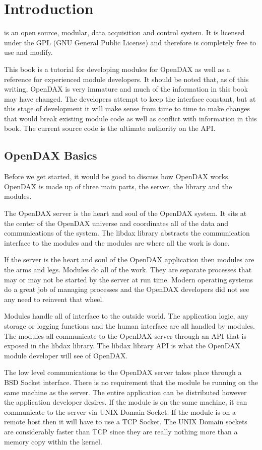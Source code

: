 \chapter{Introduction}
\opendax is an open source, modular, data acquisition and control system. It is licensed under the GPL (GNU General Public License) and therefore is completely free to use and modify.

This book is a tutorial for developing modules for OpenDAX as well as a reference for experienced module developers.  It should be noted that, as of this writing, OpenDAX is very immature and much of the information in this book may have changed.  The developers attempt to keep the interface constant, but at this stage of development it will make sense from time to time to make changes that would break existing module code as well as conflict with information in this book.  The current source code is the ultimate authority on the API.


\section{OpenDAX Basics}
Before we get started, it would be good to discuss how OpenDAX works.  OpenDAX is made up of three main parts, the server, the library and the modules.

The OpenDAX server is the heart and soul of the OpenDAX system.  It sits at the center of the OpenDAX universe and coordinates all of the data and communications of the system.  The libdax library abstracts the communication interface to the modules and the modules are where all the work is done.

If the server is the heart and soul of the OpenDAX application then modules are the arms and legs.  Modules do all of the work.  They are separate processes that may or may not be started by the server at run time.  Modern operating systems do a great job of managing processes and the OpenDAX developers did not see any need to reinvent that wheel.  

Modules handle all of interface to the outside world.  The application logic, any storage or logging functions and the human interface are all handled by modules.  The modules all communicate to the OpenDAX server through an API that is exposed in the libdax library.  The libdax library API is what the OpenDAX module developer will see of OpenDAX.

The low level communications to the OpenDAX server takes place through a BSD Socket interface.  There is no requirement that the module be running on the same machine as the server.  The entire application can be distributed however the application developer desires.  If the module is on the same machine, it can communicate to the server via UNIX Domain Socket.  If the module is on a remote host then it will have to use a TCP Socket.  The UNIX Domain sockets are considerably faster than TCP since they are really nothing more than a memory copy within the kernel.

